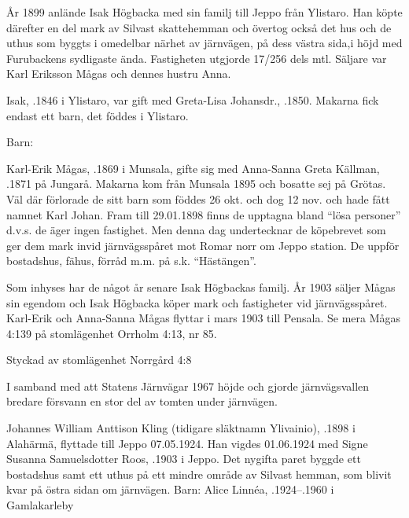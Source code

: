 %
År 1899 anlände Isak Högbacka med sin familj till Jeppo från Ylistaro. Han köpte därefter en del mark av Silvast skattehemman och övertog också det hus och de uthus som byggts i omedelbar närhet av järnvägen, på dess västra sida,i höjd med Furubackens sydligaste ända. Fastigheten utgjorde 17/256 dels mtl. Säljare var Karl Eriksson Mågas och dennes hustru Anna.

Isak, .1846 i Ylistaro, var gift med Greta-Lisa Johansdr., .1850. Makarna fick endast ett barn, det föddes i Ylistaro.

Barn: 


%
Karl-Erik Mågas, .1869 i Munsala, gifte sig med Anna-Sanna Greta Källman, .1871 på Jungarå. Makarna kom från Munsala 1895 och bosatte sej på Grötas. Väl där förlorade de sitt barn som föddes 26 okt. och dog 12 nov. och hade fått namnet Karl Johan. Fram till 29.01.1898 finns de upptagna bland ``lösa personer'' d.v.s. de äger ingen fastighet. Men denna dag undertecknar de köpebrevet som ger dem mark invid järnvägsspåret mot Romar norr om Jeppo station. De uppför bostadshus, fähus, förråd m.m. på s.k. ``Hästängen''.

Som inhyses har de något år senare Isak Högbackas familj. År 1903 säljer Mågas sin egendom och Isak Högbacka köper mark och fastigheter vid järnvägsspåret. Karl-Erik och Anna-Sanna Mågas flyttar i mars 1903 till Pensala. Se mera Mågas 4:139	på stomlägenhet Orrholm 4:13, nr 85.



%

Styckad av stomlägenhet Norrgård 4:8


%
I samband med att Statens Järnvägar 1967  höjde och gjorde 	järnvägsvallen bredare försvann en stor del av tomten under järnvägen.\jhvspace{}



%
Johannes William Anttison Kling (tidigare släktnamn Ylivainio), .1898 i Alahärmä, flyttade till Jeppo 07.05.1924. Han vigdes 01.06.1924 med Signe Susanna Samuelsdotter Roos, .1903 i Jeppo. Det nygifta paret byggde ett bostadshus samt ett uthus 	på ett mindre område av Silvast hemman, som blivit kvar på östra sidan om järnvägen.
Barn: Alice Linnéa, .1924--.1960 i Gamlakarleby

